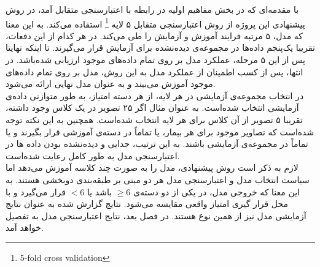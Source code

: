 
با مقدمه‌ای که در بخش مفاهیم اولیه در رابطه با اعتبارسنجی متقابل آمد، در روش پیشنهادی این پروژه از روش اعتبارسنجی متقابل ۵ لایه
\footnote{5-fold cross validation}
استفاده می‌کند.
به این معنا که مدل، ۵ مرتبه فرایند آموزش و آزمایش را طی می‌کند.
 در هر کدام از این دفعات، تقریبا یک‌پنجم داده‌ها در مجموعه‌ی دیده‌نشده برای آزمایش قرار می‌گیرند.
 تا اینکه نهایتا پس از این ۵ مرحله، عملکرد مدل بر روی تمام داده‌های موجود ارزیابی شده‌باشد.
 در انتها، پس از کسب اطمینان از عملکرد مدل به این روش، مدل بر روی تمام داده‌های موجود آموزش می‌بیند و به عنوان مدل نهایی ارائه می‌شود.\\

در انتخاب مجموعه‌ی آزمایشی در هر لایه، از هر دسته امتیاز، به طور متوازنی داده‌ی آزمایشی انتخاب شده‌است.
به عنوان مثال اگر ۲۵ تصویر در یک کلاس وجود داشته، تقریبا ۵ تصویر از آن کلاس برای هر لایه انتخاب شده‌است.
همچنین به این نکته توجه شده‌است که تصاویر موجود برای هر بیمار، یا تماماً در دسته‌ی آموزشی قرار بگیرند و یا تماماً در مجموعه‌ی آزمایشی باشند.
به این ترتیب، جدایی و  دیده‌نشده بودن داده ها در اعتبارسنجی مدل به طور کامل رعایت شده‌است.\\

لازم به ذکر است
روش پیشنهادی، مدل را به صورت چند کلاسه آموزش می‌دهد اما سیاست انتخاب مدل و اعتبارسنجی مدل هر دو مبنی بر طبقه‌بندی دو‌بخشی هستند.
به این معنا که خروجی مدل، 
در یکی از دو دسته‌ی 
$\geq 6$ باشد یا $< 6$
قرار می‌گیرد و با محل قرار گیری امتیاز واقعی مقایسه می‌شود.
نتایج گزارش شده به عنوان نتایج آزمایشی مدل نیز از همین نوع هستند. 
در فصل بعد، نتایج اعتبارسنجی مدل به تفصیل خواهد آمد.
